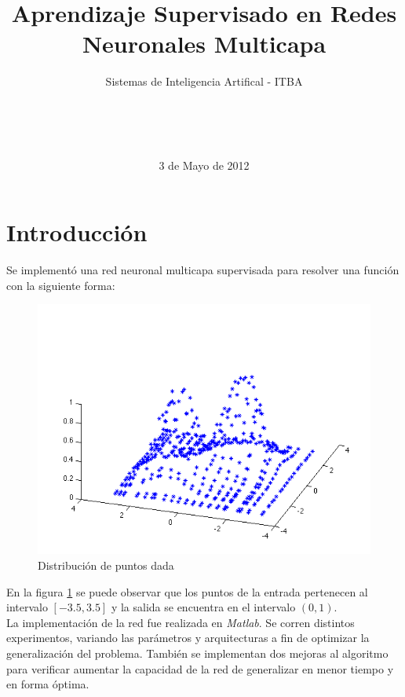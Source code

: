 \documentclass{sig-alternate}
\begin{document}

\title{Aprendizaje Supervisado en Redes Neuronales Multicapa}
\subtitle{Sistemas de Inteligencia Artifical - ITBA}


\author{
	\\
	\\
	\\	
}

\date{3 de Mayo de 2012}

\maketitle

\section*{Introducción}

	Se implementó una red neuronal multicapa supervisada para resolver una función con la siguiente forma:

	\begin{figure}[!ht]
		\includegraphics[scale=0.5]{./figures/function.png}
  		\caption{Distribución de puntos dada}
  		\label{fig:function}
	\end{figure}

	En la figura \ref{fig:function} se puede observar que los puntos de la entrada pertenecen al intervalo $[-3.5, 3.5]$ y la salida se encuentra en el intervalo $(0, 1)$.\\
	La implementación de la red fue realizada en \textit{Matlab}. Se corren distintos experimentos, variando las parámetros y arquitecturas a fin de optimizar la generalización del problema. También se implementan dos mejoras al algoritmo para verificar aumentar la capacidad de la red de generalizar en menor tiempo y en forma óptima.
\end{document}
